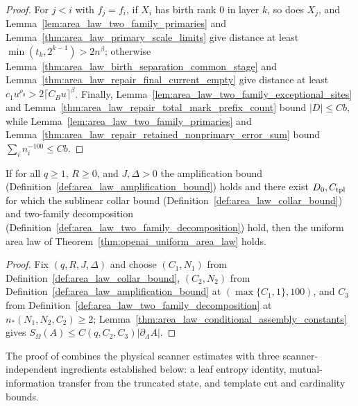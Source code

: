 \begin{proof}
    For $j<i$ with $f_j=f_i$, if $X_i$ has birth rank $0$ in layer $k$, so does
    $X_j$, and Lemma~\ref{lem:area_law_two_family_primaries} and
    Lemma~\ref{thm:area_law_primary_scale_limits} give distance at least
    $\min(t_k,2^{k-1})>2n^\beta$; otherwise
    Lemma~\ref{thm:area_law_birth_separation_common_stage} and
    Lemma~\ref{thm:area_law_repair_final_current_empty} give distance at least
    $c_1u^{\rho_0}>2\lceil C_Bu\rceil^\beta$. Finally,
    Lemma~\ref{lem:area_law_two_family_exceptional_sites} and
    Lemma~\ref{thm:area_law_repair_total_mark_prefix_count} bound $|D|\le Cb$,
    while Lemma~\ref{lem:area_law_two_family_primaries} and
    Lemma~\ref{thm:area_law_repair_retained_nonprimary_error_sum} bound
    $\sum_in_i^{-100}\le Cb$.
\end{proof}

\begin{lemma}
    \label{thm:area_law_conditional_assembly}
    \leanok
    If for all $q\ge1$, $R\ge0$, and $J,\Delta>0$ the amplification bound
    (Definition~\ref{def:area_law_amplification_bound}) holds and there exist
    $D_0,C_{\rm tpl}$ for which the sublinear collar bound
    (Definition~\ref{def:area_law_collar_bound}) and two-family decomposition
    (Definition~\ref{def:area_law_two_family_decomposition}) hold, then the
    uniform area law of Theorem~\ref{thm:openai_uniform_area_law} holds.
\end{lemma}
\begin{proof}
    \leanok
    Fix $(q,R,J,\Delta)$ and choose $(C_1,N_1)$ from
    Definition~\ref{def:area_law_collar_bound}, $(C_2,N_2)$ from
    Definition~\ref{def:area_law_amplification_bound} at $(\max\{C_1,1\},100)$,
    and $C_3$ from Definition~\ref{def:area_law_two_family_decomposition} at
    $n_*(N_1,N_2,C_2)\ge2$; Lemma~\ref{thm:area_law_conditional_assembly_constants}
    gives $S_\Omega(A)\le C(q,C_2,C_3)|\partial_\Lambda A|$.
\end{proof}

The proof of \cite[Proposition~9.6]{OpenAI2026AreaLaw} combines the physical
scanner estimates with three scanner-independent ingredients established below:
a leaf entropy identity, mutual-information transfer from the truncated state,
and template cut and cardinality bounds.


